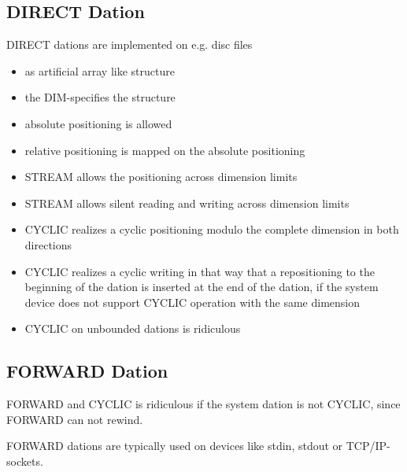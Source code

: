 \subsection{DIRECT Dation}
DIRECT dations are implemented on e.g. disc files
\begin{itemize}
\item    as artificial array like structure
\item    the DIM-specifies the structure
\item    absolute positioning is allowed
\item    relative positioning is mapped on the absolute positioning
\item    STREAM allows the positioning across dimension limits
\item    STREAM allows silent reading and writing across dimension limits
 \item   CYCLIC realizes a cyclic positioning modulo the complete
        dimension in both directions
\item    CYCLIC realizes a cyclic writing in that way that a
          repositioning to the beginning of the dation is inserted
          at the end of the dation, if the system device does not support
          CYCLIC operation with the same dimension
\item    CYCLIC on unbounded dations is ridiculous
\end{itemize}

\subsection{FORWARD Dation}
FORWARD and CYCLIC is ridiculous if the system dation is not CYCLIC,
 since FORWARD can not rewind.

FORWARD dations are typically used on devices like stdin, 
stdout or TCP/IP-sockets.

